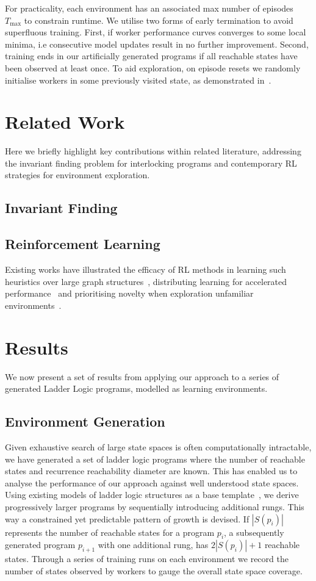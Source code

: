 \documentclass[conference,compsoc]{IEEEtran}
\begin{document}
For practicality, each environment has an associated max number of episodes $T_{\max}$ to constrain runtime. We utilise two forms of early termination to avoid superfluous training. First, if worker performance curves converges to some local minima, i.e consecutive model updates result in no further improvement. Second, training ends in our artificially generated programs if all reachable states have been observed at least once. To aid exploration, on episode resets we randomly initialise workers in some previously visited state, as demonstrated in~\cite{gordillo2021improving}. 

\section{Related Work}
Here we briefly highlight key contributions within related literature, addressing the invariant finding problem for interlocking programs and contemporary RL strategies for environment exploration.

\subsection{Invariant Finding}


\subsection{Reinforcement Learning}
Existing works have illustrated the efficacy of RL methods in learning such heuristics over large graph structures~\cite{manchanda2019learning}, distributing learning for accelerated performance~\cite{hoffman2020acme} and prioritising novelty when exploration unfamiliar environments~\cite{ostrovski2017countbased, haarnoja2018soft, gordillo2021improving}.

\section{Results}
We now present a set of results from applying our approach to a series of generated Ladder Logic programs, modelled as learning environments. 
\subsection{Environment Generation}

Given exhaustive search of large state spaces is often computationally intractable, we have generated a set of ladder logic programs where the number of reachable states and recurrence reachability diameter are known. This has enabled us to analyse the performance of our approach against well understood state spaces. Using existing models of ladder logic structures as a base template~\cite{james2013verification}, we derive progressively larger programs by sequentially introducing additional rungs. This way a constrained yet predictable pattern of growth is devised. If $|S(p_i)|$ represents the number of reachable states for a program $p_i$, a subsequently generated program $p_{i+1}$ with one additional rung, has $2|S(p_i)|+1$ reachable states. Through a series of training runs on each environment we record the number of states observed by workers to gauge the overall state space coverage. 
\end{document}
